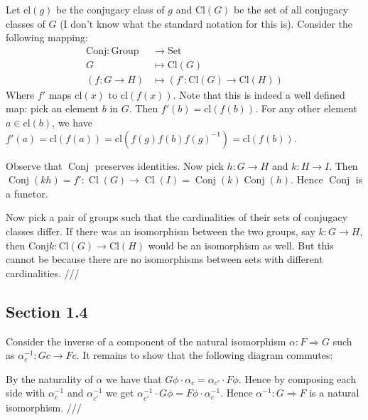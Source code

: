 \documentclass[12pt]{article}
\newcommand{\exercise}[1]{\fbox{\textbf{Exercise #1}}}
\newcommand{\ra}{\rightarrow}
\newcommand{\oper}{\operatorname}
\begin{document}
  \exercise{1.3.x} Let $\mathrm{cl}(g)$ be the conjugacy class of $g$ and $\mathrm{Cl}(G)$ be the set of all conjugacy classes of $G$ (I don't know what the standard notation for this is). Consider the following mapping:
  \begin{align*}
    \mathrm{Conj} : \mathrm{Group} &\longrightarrow \mathrm{Set} \\
    G &\longmapsto \text{Cl}(G) \\
    (f : G \ra H) &\longmapsto (f': \mathrm{Cl}(G) \ra \mathrm{Cl}(H))
  \end{align*}
  Where $f'$ maps $\mathrm{cl}(x)$ to $\mathrm{cl}(f(x))$. Note that this is indeed a well defined map: pick an element $b$ in $G$. Then $f'(b) = \mathrm{cl}(f(b))$. For any other element $a \in \mathrm{cl}(b)$, we have $f'(a) = \mathrm{cl}(f(a)) = \mathrm{cl}(f(g)f(b)f(g)^{-1}) = \mathrm{cl}(f(b))$. 

  Observe that $\oper{Conj}$ preserves identities. Now pick $h : G \ra H$ and $k : H \ra I$. Then $\oper{Conj}(kh) = f' : \oper{Cl}(G) \ra \oper{Cl}(I) = \oper{Conj}(k)\oper{Conj}(h)$. Hence $\oper{Conj}$ is a functor. 

  Now pick a pair of groups such that the cardinalities of their sets of conjugacy classes differ. If there was an isomorphism between the two groups, say $k : G \ra H$, then $\mathrm{Conj} k : \mathrm{Cl}(G) \ra \mathrm{Cl}(H)$ would be an isomorphism as well. But this cannot be because there are no isomorphisms between sets with different cardinalities. ///


  \subsection*{Section 1.4}

  \exercise{1.4.i} Consider the inverse of a component of the natural isomorphism $\alpha : F \Rightarrow G$ such as $\alpha^{-1}_c : Gc \ra Fc$. It remains to show that the following diagram commutes: 
  \begin{center}
  \end{center}

  By the naturality of $\alpha$ we have that $G\phi \cdot \alpha_c = \alpha_{c'} \cdot F\phi$. Hence by composing each side with $\alpha_c^{-1}$ and $\alpha_{c'}^{-1}$ we get $\alpha_{c'}^{-1} \cdot G\phi = F\phi \cdot \alpha_{c}^{-1}$. Hence $\alpha^{-1} : G \Rightarrow F$ is a natural isomorphism. ///
\end{document}
